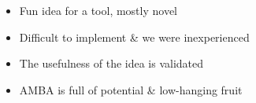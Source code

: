 \begin{frame}
	\begin{itemize}

		\item Fun idea for a tool, mostly novel

		\item Difficult to implement \& we were inexperienced

		\item The usefulness of the idea is validated

		\item AMBA is full of potential \& low-hanging fruit

	\end{itemize}
	\vfill
\end{frame}
